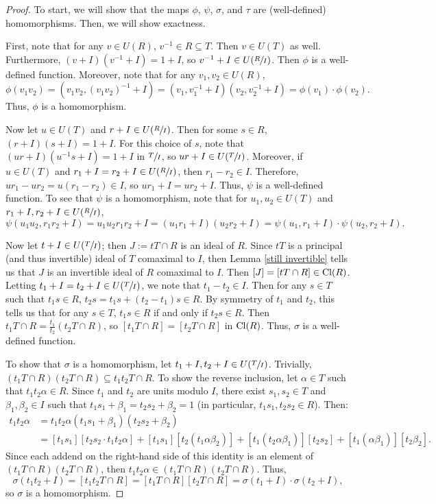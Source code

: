 \documentclass[12pt]{amsart}
\theoremstyle{definition}
\newcommand{\Cl}{\textup{Cl}}
\begin{document}
\begin{proof}
    To start, we will show that the maps $\phi$, $\psi$, $\sigma$, and $\tau$ are (well-defined) homomorphisms. Then, we will show exactness.

    First, note that for any $v\in U(R)$, $v^{-1}\in R\subseteq T$. Then $v\in U(T)$ as well. Furthermore, $(v+I)(v^{-1}+I)=1+I$, so $v^{-1}+I\in U(\sfrac{R}{I})$. Then $\phi$ is a well-defined function. Moreover, note that for any $v_1,v_2\in U(R)$,
    $$\phi(v_1v_2)=(v_1v_2,(v_1v_2)^{-1}+I)=(v_1,v_1^{-1}+I)(v_2,v_2^{-1}+I)=\phi(v_1)\cdot \phi(v_2).$$
    Thus, $\phi$ is a homomorphism.

    Now let $u\in U(T)$ and $r+I\in U(\sfrac{R}{I})$. Then for some $s\in R$, $(r+I)(s+I)=1+I$. For this choice of $s$, note that $(ur+I)(u^{-1}s+I)=1+I$ in $\sfrac{T}{I}$, so $ur+I\in U(\sfrac{T}{I})$. Moreover, if $u\in U(T)$ and $r_1+I=r_2+I\in U(\sfrac{R}{I})$, then $r_1-r_2\in I$. Therefore, $ur_1-ur_2=u(r_1-r_2)\in I$, so $ur_1+I=ur_2+I$. Thus, $\psi$ is a well-defined function. To see that $\psi$ is a homomorphism, note that for $u_1,u_2\in U(T)$ and $r_1+I,r_2+I\in U(\sfrac{R}{I})$,
    $$\psi(u_1u_2,r_1r_2+I)=u_1u_2r_1r_2+I=(u_1r_1+I)(u_2r_2+I)=\psi(u_1,r_1+I)\cdot\psi(u_2,r_2+I).$$

    Now let $t+I\in U(\sfrac{T}{I})$; then $J:=tT\cap R$ is an ideal of $R$. Since $tT$ is a principal (and thus invertible) ideal of $T$ comaximal to $I$, then Lemma \ref{still invertible} tells us that $J$ is an invertible ideal of $R$ comaximal to $I$. Then $[J]=[tT\cap R]\in \Cl(R)$. Letting $t_1+I=t_2+I\in U(\sfrac{T}{I})$, we note that $t_1-t_2\in I$. Then for any $s\in T$ such that $t_1s\in R$, $t_2s=t_1s+(t_2-t_1)s\in R$. By symmetry of $t_1$ and $t_2$, this tells us that for any $s\in T$, $t_1s\in R$ if and only if $t_2s\in R$. Then $t_1T\cap R=\frac{t_1}{t_2}(t_2T\cap R)$, so $[t_1T\cap R]=[t_2T\cap R]$ in $\Cl(R)$. Thus, $\sigma$ is a well-defined function.

    To show that $\sigma$ is a homomorphism, let $t_1+I,t_2+I\in U(\sfrac{T}{I})$. Trivially, $(t_1T\cap R)(t_2T\cap R)\subseteq t_1t_2T\cap R$. To show the reverse inclusion, let $\alpha\in T$ such that $t_1t_2\alpha\in R$. Since $t_1$ and $t_2$ are units modulo $I$, there exist $s_1,s_2\in T$ and $\beta_1,\beta_2\in I$ such that $t_1s_1+\beta_1=t_2s_2+\beta_2=1$ (in particular, $t_1s_1,t_2s_2\in R$). Then:
    \begin{align*}
        t_1t_2\alpha&=t_1t_2\alpha(t_1s_1+\beta_1)(t_2s_2+\beta_2)\\&=[t_1s_1][t_2s_2\cdot t_1t_2\alpha]+[t_1s_1][t_2(t_1\alpha\beta_2)]+[t_1(t_2\alpha\beta_1)][t_2s_2]+[t_1(\alpha\beta_1)][t_2\beta_2].
    \end{align*}
    Since each addend on the right-hand side of this identity is an element of $(t_1T\cap R)(t_2T\cap R)$, then $t_1t_2\alpha\in (t_1T\cap R)(t_2T\cap R)$. Thus, $$\sigma(t_1t_2+I)=[t_1t_2T\cap R]=[t_1T\cap R][t_2T\cap R]=\sigma(t_1+I)\cdot \sigma(t_2+I),$$
    so $\sigma$ is a homomorphism.


\end{proof}
\end{document}
